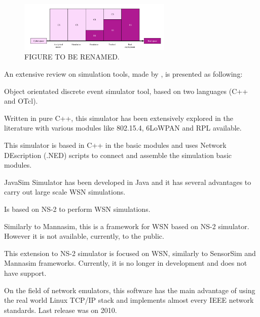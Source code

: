 \begin{figure}[h!]
	\centering
	\includegraphics[width=0.65\textwidth,keepaspectratio]{figures/simul_VS_emul}
	\caption{FIGURE TO BE RENAMED.}
	
\end{figure}

An extensive review on simulation tools, made by \cite{nayyar2015}, is presented as following:

\begin{description}
	\setlength\itemsep{0.5em}
	\item [NS-2 (network simulator-2)] 
	Object orientated discrete event simulator tool, based on two languages (C++ and OTcl). 
	
	\item [NS-3 (network simulator-3)] 
	Written in pure C++, this simulator has been extensively explored in the literature with various modules like 802.15.4, 6LoWPAN and RPL available.
	
	\item [OMNET++] 
	This simulator is based in C++ in the basic modules and uses Network DEscription (.NED) scripts to connect and assemble the simulation basic modules.

	\item [J-Sim] 
	JavaSim Simulator has been developed in Java and it has several advantages to carry out large scale WSN simulations.

	\item [Mannasim] 
	Is based on NS-2 to perform WSN simulations.

	\item [SensorSim] 
	Similarly to Mannasim, this is a framework for WSN based on NS-2 simulator. However it is not available, currently, to the public. 

	\item [NRL Sensorsim] 
	This extension to NS-2 simulator is focused on WSN, similarly to SensorSim and Mannasim frameworks. Currently, it is no longer in development and does not have support.

	\item [NCTUns 6.0] 
	On the field of network emulators, this software has the main advantage of using the real world Linux TCP/IP stack and implements almost every IEEE network standards. Last release was on 2010.


\end{description}

